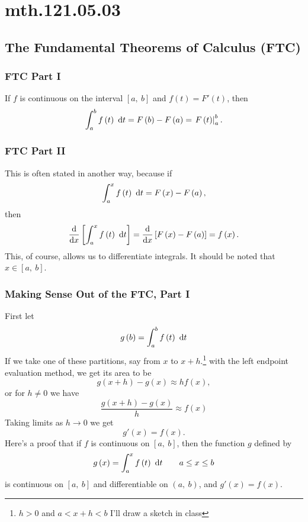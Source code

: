 \documentclass[12pt,addpoints, answers, fleqn]{exam}
\begin{document}
\section{mth.121.05.03}
\subsection{The Fundamental Theorems of Calculus (FTC)}
\subsubsection{FTC Part I}
If $f$ is continuous on the interval $\left[ a, \ b \right]$ and $f\left(t\right) = F'\left( t \right)$, then
\[
\int_a^b f \left( t \right) \ {\rm{d}}t = F\left( b \right) - F\left( a \right) = \left. F\left( t \right) \right|_a^b.
\]
\subsubsection{FTC Part II}
This is often stated in another way, because if
\[
\int_a^x f \left( t \right) \ {\rm{d}}t = F\left( x \right) - F\left( a \right),
\]
then
\[
\frac{{\rm{d}}}{{\rm{d}}x}\left[ \int_a^x f \left( t \right) \ {\rm{d}}t \right] = \frac{{\rm{d}}}{{\rm{d}}x}\left[ F\left( x \right) - F\left( a \right)\right] = f \left( x \right).
\]
This, of course, allows us to differentiate integrals. It should be noted that $x \in \left[ a, \ b \right]$.
\subsubsection{Making Sense Out of the FTC, Part I}
First let
\[
g \left( b \right) = \int_a^b f \left( t \right) \ {\rm{d}}t
\]
If we take one of these partitions, say from $x$ to $x+h$.\footnote{$h>0$ and $a<x+h<b$ I'll draw a sketch in class} with the left endpoint evaluation method, we get its area to be
\[
g \left(x + h \right) - g \left( x \right) \approx h f \left(x\right),
\]
or for $h \neq 0$ we have
\[
\frac{g \left(x + h \right) - g \left( x \right)}{h} \approx f \left(x\right) 
\]
Taking limits as $h \to 0$ we get
\[
g'\left( x \right) = f \left(x\right).
\]
Here's a proof that if $f$ is continuous on $\left[ a, \ b \right]$, then the function $g$ defined by
\[
g \left( x \right)  = \int_a^x f \left( t \right) \ {\rm{d}}t \qquad a \leq x \leq b
\]
is continuous on $\left[ a, \ b \right]$ and differentiable on $\left( a, \ b \right)$, and $g' \left( x \right)=f \left( x \right)$.
\end{document}
